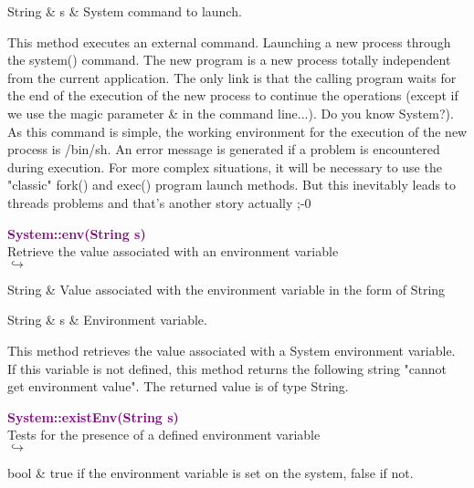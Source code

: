 \begin{tcolorbox}[width=\textwidth,myArgs,tabularx={ll|R}]
String & s & System command to launch.
\end{tcolorbox}

This method executes an external command. Launching a new process through the system() command.
The new program is a new process totally independent from the current application.
The only link is that the calling program waits for the end of the execution of the new process to continue the operations (except if we use the magic parameter \& in the command line...).
Do you know System?). As this command is simple, the working environment for the execution of the new process is /bin/sh. An error message is generated if a problem is encountered during execution.
For more complex situations, it will be necessary to use the "classic" fork() and exec() program launch methods. But this inevitably leads to threads problems and that's another story actually ;-0

\textcolor{purple}{\textbf{System::env(String s)}}\label{System::env(String s)}\\
Retrieve the value associated with an environment variable\\ \hspace*{5mm}$\hookrightarrow$
\vspace*{-2em}\begin{tcolorbox}[grow to left by=-1cm, width=\textwidth-1cm,myArgs,tabularx={l|R}]
String & Value associated with the environment variable in the form of String
\end{tcolorbox}

\begin{tcolorbox}[width=\textwidth,myArgs,tabularx={ll|R}]
String & s & Environment variable.
\end{tcolorbox}

This method retrieves the value associated with a System environment variable. If this variable is not defined, this method returns the following string "cannot get environment value". The returned value is of type String.

\textcolor{purple}{\textbf{System::existEnv(String s)}}\label{System::existEnv(String s)}\\
Tests for the presence of a defined environment variable\\ \hspace*{5mm}$\hookrightarrow$
\vspace*{-2em}\begin{tcolorbox}[grow to left by=-1cm, width=\textwidth-1cm,myArgs,tabularx={l|R}]
bool & true if the environment variable is set on the system, false if not.
\end{tcolorbox}

